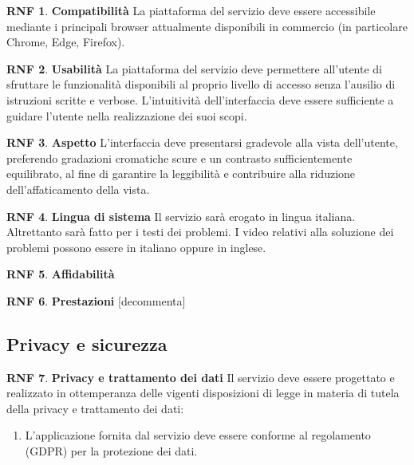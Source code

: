 \documentclass[11pt, a4paper]{article}
\theoremstyle{definition}
\newtheorem{nonfuncreq}{RNF} %
\begin{document}
\begin{nonfuncreq}
\label{compatibility}
\textbf{Compatibilità }
La piattaforma del servizio deve essere accessibile mediante i principali
browser attualmente disponibili in commercio (in particolare Chrome, Edge,
Firefox).
\end{nonfuncreq}


\begin{nonfuncreq}
\textbf{Usabilità }
La piattaforma del servizio deve permettere all'utente di sfruttare le
funzionalità disponibili al proprio livello di accesso senza l'ausilio di
istruzioni scritte e verbose. L'intuitività dell'interfaccia deve essere
sufficiente a guidare l'utente nella realizzazione dei suoi scopi.
\end{nonfuncreq}

\begin{nonfuncreq}
\textbf{Aspetto }
L'interfaccia deve presentarsi gradevole alla vista dell'utente, preferendo
gradazioni cromatiche scure e un contrasto sufficientemente equilibrato,
al fine di garantire la leggibilità e contribuire alla riduzione
dell'affaticamento della vista.
\end{nonfuncreq}

\begin{nonfuncreq}
\textbf{Lingua di sistema }
Il servizio sarà erogato in lingua italiana. Altrettanto sarà fatto per i
testi dei problemi. I video relativi alla soluzione dei problemi possono
essere in italiano oppure in inglese.
\end{nonfuncreq}

\begin{nonfuncreq}
\textbf{Affidabilità }

\end{nonfuncreq}

\begin{nonfuncreq}
\textbf{Prestazioni }
[decommenta]
\end{nonfuncreq}

\subsection{Privacy e sicurezza}

\begin{nonfuncreq}
\textbf{Privacy e trattamento dei dati }
Il servizio deve essere progettato e realizzato in ottemperanza delle
vigenti disposizioni di legge in materia di tutela della privacy e
trattamento dei dati:
\begin{enumerate}
    \item L'applicazione fornita dal servizio deve essere conforme
    al regolamento \href{https://www.garanteprivacy.it/documents/10160/0/Regolamento+UE+2016+679.+Arricchito+con+riferimenti+ai+Considerando+Aggiornato+alle+rettifiche+pubblicate+sulla+Gazzetta+Ufficiale++dell%27Unione+europea+127+del+23+maggio+2018}{\textcolor{blue}{\underbar{UE n.2016/679}}} (GDPR) per la protezione dei dati.
\end{enumerate}
\end{nonfuncreq}
\end{document}
